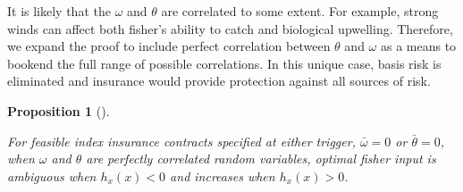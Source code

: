 \documentclass[
  letterpaper,
  DIV=11,
  numbers=noendperiod]{scrartcl}
\theoremstyle{plain}
\theoremstyle{plain}
\newtheorem{proposition}{Proposition}[section]
\theoremstyle{remark}
\begin{document}
It is likely that the \(\omega\) and \(\theta\) are correlated to some
extent. For example, strong winds can affect both fisher's ability to
catch and biological upwelling. Therefore, we expand the proof to
include perfect correlation between \(\theta\) and \(\omega\) as a means
to bookend the full range of possible correlations. In this unique case,
basis risk is eliminated and insurance would provide protection against
all sources of risk.

\begin{proposition}[]\protect\hypertarget{prp-corr}{}\label{prp-corr}

For feasible index insurance contracts specified at either trigger,
\(\bar\omega=0\) or \(\bar\theta=0\), when \(\omega\) and \(\theta\) are
perfectly correlated random variables, optimal fisher input is ambiguous
when \(h_x(x)<0\) and increases when \(h_x(x)>0\).

\end{proposition}
\end{document}
